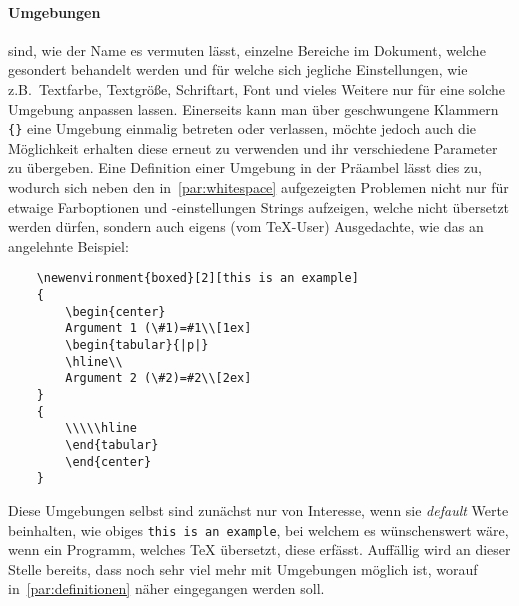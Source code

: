 \paragraph*{Umgebungen} sind, wie der Name es vermuten lässt, einzelne Bereiche im Dokument, welche gesondert behandelt werden und für welche sich jegliche Einstellungen, wie z.B.\ Textfarbe, Textgröße, Schriftart, Font und vieles Weitere nur für eine solche Umgebung anpassen lassen. Einerseits kann man über geschwungene Klammern \verb|{}| eine Umgebung einmalig betreten oder verlassen, möchte jedoch auch die Möglichkeit erhalten diese erneut zu verwenden und ihr verschiedene Parameter zu übergeben. Eine Definition einer Umgebung in der Präambel lässt dies zu, %
wodurch sich neben den in~\ref{par:whitespace} aufgezeigten Problemen nicht nur für etwaige Farboptionen und -einstellungen Strings aufzeigen, welche nicht übersetzt werden dürfen, sondern auch eigens (vom \TeX{}-User) Ausgedachte, wie das an \citep{latex:overleaf:environments} angelehnte Beispiel:
\begin{Verbatim}
    \newenvironment{boxed}[2][this is an example]
    {
        \begin{center}
        Argument 1 (\#1)=#1\\[1ex]
        \begin{tabular}{|p|}
        \hline\\
        Argument 2 (\#2)=#2\\[2ex]
    }
    { 
        \\\\\hline
        \end{tabular} 
        \end{center}
    }
\end{Verbatim}
Diese Umgebungen selbst sind zunächst nur von Interesse, wenn sie \textit{default} Werte beinhalten, wie obiges \texttt{this is an example}, bei welchem es wünschenswert wäre, wenn ein Programm, welches \TeX{} übersetzt, diese erfässt. Auffällig wird an dieser Stelle bereits, dass noch sehr viel mehr mit Umgebungen möglich ist, worauf in~\ref{par:definitionen} näher eingegangen werden soll.

